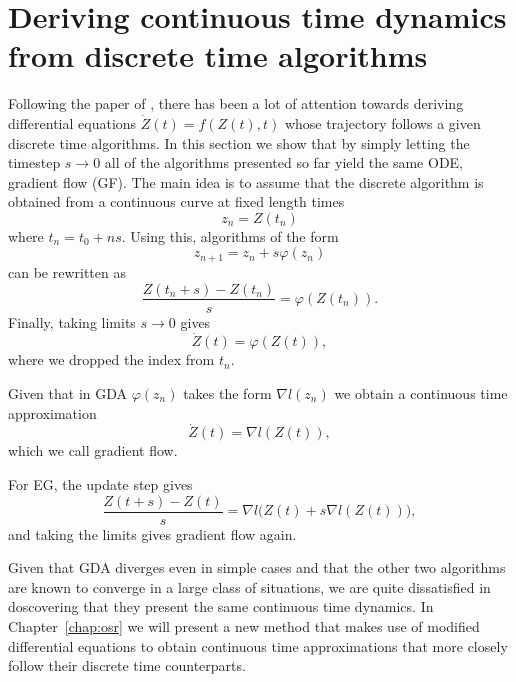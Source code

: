 \documentclass[main.tex]{subfiles}
\begin{document}
\section{Deriving continuous time dynamics from discrete time algorithms}
Following the paper of \cite{suDifferentialEquationModeling2016}, there has been a
lot of attention towards deriving differential equations $\dot Z(t) = f(Z(t),
	t)$ whose trajectory
follows a given discrete time algorithms.
In this section we show that by
simply letting the timestep $s \to 0$ all
of the algorithms presented so far yield the same ODE, gradient flow (GF).
The main idea is to assume that the discrete algorithm is obtained from
a continuous curve at fixed length times \[z_n = Z(t_n)\] where $t_n = t_0 + ns.$
Using this, algorithms of the form \[z_{n+1} = z_n + s\varphi(z_n)\] can
be rewritten as \[\frac{Z(t_n + s) - Z(t_n)}{s} = \varphi(Z(t_n)).\]
Finally, taking limits $s \to 0$ gives \[\dot Z(t) = \varphi(Z(t)),\] where
we dropped the index from $t_n.$
\begin{ex}
	Given that in GDA $\varphi(z_n)$ takes the form $\nabla l(z_n)$ we obtain a
	continuous time approximation \[\dot Z(t) = \nabla l(Z(t)),\] which we call gradient flow.
\end{ex}
\begin{ex}
    For EG, the update step gives \[\frac{Z(t + s) - Z(t)}{s} = \nabla l
    \big(Z(t) + s \nabla l(Z(t))\big),\]
    and taking the limits gives gradient flow again.
\end{ex}
  Given that GDA diverges even in simple cases and that the
other two algorithms are known to converge in a large class of situations, we
are quite dissatisfied in doscovering that they present the same continuous
time dynamics. 
In Chapter~\ref{chap:osr} we will present a new method that makes use of
modified differential equations to obtain continuous time approximations that
more closely follow their discrete time counterparts.
\end{document}
